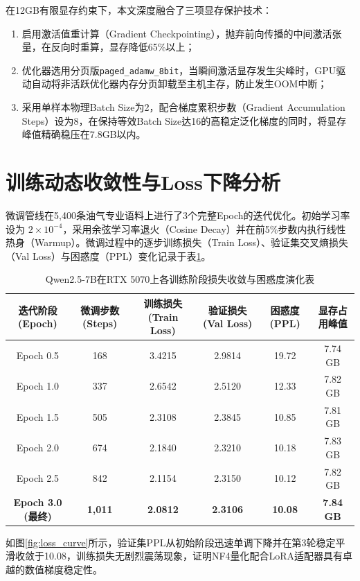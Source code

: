 \documentclass[UTF8,a4paper,zihao=-4,openany,twoside]{ctexbook}
\begin{document}
在12GB有限显存约束下，本文深度融合了三项显存保护技术：
\begin{enumerate}
    \item 启用激活值重计算（Gradient Checkpointing），抛弃前向传播的中间激活张量，在反向时重算，显存降低65\%以上；
    \item 优化器选用分页版\texttt{paged\_adamw\_8bit}，当瞬间激活显存发生尖峰时，GPU驱动自动将非活跃优化器内存分页卸载至主机主存，防止发生OOM中断；
    \item 采用单样本物理Batch Size为2，配合梯度累积步数（Gradient Accumulation Steps）设为8，在保持等效Batch Size达16的高稳定泛化梯度的同时，将显存峰值精确稳压在7.8GB以内。
\end{enumerate}

\section{训练动态收敛性与Loss下降分析}
微调管线在5,400条油气专业语料上进行了3个完整Epoch的迭代优化。初始学习率设为 $2 \times 10^{-4}$，采用余弦学习率退火（Cosine Decay）并在前5\%步数内执行线性热身（Warmup）。微调过程中的逐步训练损失（Train Loss）、验证集交叉熵损失（Val Loss）与困惑度（PPL）变化记录于表\ref{tab:training_dynamics}。

\begin{table}[htbp]
\centering
\caption{Qwen2.5-7B在RTX 5070上各训练阶段损失收敛与困惑度演化表}
\label{tab:training_dynamics}
\begin{tabularx}{\textwidth}{cccccc}
\toprule
\textbf{迭代阶段 (Epoch)} & \textbf{微调步数 (Steps)} & \textbf{训练损失 (Train Loss)} & \textbf{验证损失 (Val Loss)} & \textbf{困惑度 (PPL)} & \textbf{显存占用峰值} \\
\midrule
Epoch 0.5 & 168 & 3.4215 & 2.9814 & 19.72 & 7.74 GB \\
Epoch 1.0 & 337 & 2.6542 & 2.5120 & 12.33 & 7.82 GB \\
Epoch 1.5 & 505 & 2.3108 & 2.3845 & 10.85 & 7.81 GB \\
Epoch 2.0 & 674 & 2.1840 & 2.3210 & 10.18 & 7.83 GB \\
Epoch 2.5 & 842 & 2.1154 & 2.3150 & 10.12 & 7.82 GB \\
\textbf{Epoch 3.0 (最终)} & \textbf{1,011} & \textbf{2.0812} & \textbf{2.3106} & \textbf{10.08} & \textbf{7.84 GB} \\
\bottomrule
\end{tabularx}
\end{table}

如图\ref{fig:loss_curve}所示，验证集PPL从初始阶段迅速单调下降并在第3轮稳定平滑收敛于10.08，训练损失无剧烈震荡现象，证明NF4量化配合LoRA适配器具有卓越的数值梯度稳定性。
\end{document}
